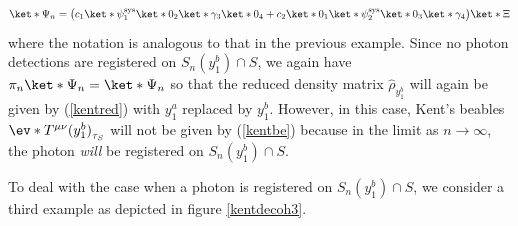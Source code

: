 \documentclass[12pt]{report}
\begin{document}
 \begin{equation*}
 \ket*{\Psi_n}=\big(c_1\ket*{\psi_1^\text{sys}}\ket*{0_2}\ket*{\gamma_3}\ket*{0_4}+c_2\ket*{0_1}\ket*{\psi_2^\text{sys}}\ket*{0_3}\ket*{\gamma_4}\big)\ket*{\Xi}
 \end{equation*}
 where the notation is analogous to that in the previous example. Since no photon detections are registered on $S_n(y^b_1)\cap S$, we again have $\pi_n\ket*{\Psi_n}=\ket*{\Psi_n}$ so that the reduced density matrix $\hat{\rho}_{y_1^b}$ will again be given by  (\ref{kentred}) with $y^a_1$ replaced by $y^b_1$. However, in this case, Kent's beables $\ev*{T^{\mu\nu}(y^b_1)}_{\tau_S}$ will not be given by (\ref{kentbe}) because in the limit as $n\rightarrow\infty$, the photon \emph{will} be registered on $S_n(y^b_1)\cap S$. 
 
 To deal with the case when a photon is registered on $S_n(y^b_1)\cap S$, we consider a third example as depicted in figure \ref{kentdecoh3}.
\end{document}
